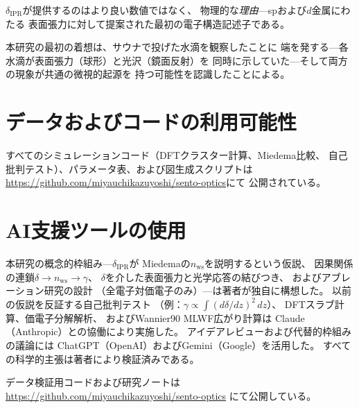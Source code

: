 \documentclass[twocolumn,showpacs,preprintnumbers,amsmath,amssymb,prb]{revtex4-2}
\begin{document}
$\delta_\mathrm{IPR}$が提供するのはより良い数値ではなく、
物理的な\emph{理由}---spおよび$d$金属にわたる
表面張力に対して提案された最初の電子構造記述子である。


\begin{acknowledgments}
本研究の最初の着想は、サウナで投げた水滴を観察したことに
端を発する---各水滴が表面張力（球形）と光沢（鏡面反射）を
同時に示していた---そして両方の現象が共通の微視的起源を
持つ可能性を認識したことによる。
\end{acknowledgments}


\section*{データおよびコードの利用可能性}

すべてのシミュレーションコード（DFTクラスター計算、Miedema比較、
自己批判テスト）、パラメータ表、および図生成スクリプトは
\url{https://github.com/miyauchikazuyoshi/sento-optics}にて
公開されている。


\section*{AI支援ツールの使用}

本研究の概念的枠組み---$\delta_\mathrm{IPR}$が
Miedemaの$n_\mathrm{ws}$を説明するという仮説、
因果関係の連鎖$\delta \to n_\mathrm{ws} \to \gamma$、
$\delta$を介した表面張力と光学応答の結びつき、
およびアブレーション研究の設計
（全電子対価電子のみ）---は著者が独自に構想した。
以前の仮説を反証する自己批判テスト
（例：$\gamma \propto \int(d\delta/dz)^2\,dz$）、
DFTスラブ計算、価電子分解解析、
およびWannier90 MLWF広がり計算は
Claude（Anthropic）との協働により実施した。
アイデアレビューおよび代替的枠組みの議論には
ChatGPT（OpenAI）およびGemini（Google）を活用した。
すべての科学的主張は著者により検証済みである。

\noindent データ検証用コードおよび研究ノートは
\url{https://github.com/miyauchikazuyoshi/sento-optics}
にて公開している。



\end{document}
